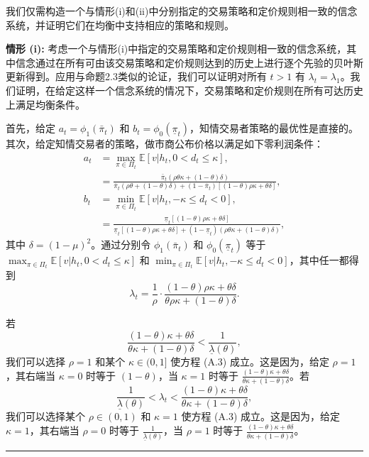 \documentclass[12pt,a4paper]{article}
\newenvironment{translation}{%
  \par\vspace{2pt}\noindent%
  \color{transblue}%
  \ignorespaces
}{%
  \par\vspace{4pt}\hrule\vspace{6pt}%
}
\begin{document}
\begin{translation}
我们仅需构造一个与情形(i)和(ii)中分别指定的交易策略和定价规则相一致的信念系统，并证明它们在均衡中支持相应的策略和规则。

\textbf{情形 (i):} 考虑一个与情形(i)中指定的交易策略和定价规则相一致的信念系统，其中信念通过在所有可由该交易策略和定价规则达到的历史上进行逐个先验的贝叶斯更新得到。应用与命题2.3类似的论证，我们可以证明对所有 $t > 1$ 有 $\lambda_t = \lambda_1$。我们证明，在给定这样一个信念系统的情况下，交易策略和定价规则在所有可达历史上满足均衡条件。

首先，给定 $a_t = \phi_1(\bar{\pi}_t)$ 和 $b_t = \phi_0(\underline{\pi}_t)$，知情交易者策略的最优性是直接的。其次，给定知情交易者的策略，做市商公布价格以满足如下零利润条件：
\begin{align*}
a_t &= \max_{\pi\in\Pi_t} \mathbb{E}[v|h_t, 0 < d_t \leq \kappa], \\
&= \frac{\bar{\pi}_t(\rho\theta\kappa + (1-\theta)\delta)}{\bar{\pi}_t(\rho\theta + (1-\theta)\delta) + (1-\bar{\pi}_t)[(1-\theta)\rho\kappa + \theta\delta]}, \\
b_t &= \min_{\pi\in\Pi_t} \mathbb{E}[v|h_t, -\kappa \leq d_t < 0], \\
&= \frac{\underline{\pi}_t[(1-\theta)\rho\kappa + \theta\delta]}{\underline{\pi}_t[(1-\theta)\rho\kappa + \theta\delta] + (1-\underline{\pi}_t)(\rho\theta\kappa + (1-\theta)\delta)},
\end{align*}
其中 $\delta = (1-\mu)^2$。通过分别令 $\phi_1(\bar{\pi}_t)$ 和 $\phi_0(\underline{\pi}_t)$ 等于 $\max_{\pi\in\Pi_t} \mathbb{E}[v|h_t, 0 < d_t \leq \kappa]$ 和 $\min_{\pi\in\Pi_t} \mathbb{E}[v|h_t, -\kappa \leq d_t < 0]$，其中任一都得到
\[
\lambda_t = \frac{1}{\rho} \cdot \frac{(1-\theta)\rho\kappa + \theta\delta}{\theta\rho\kappa + (1-\theta)\delta}. \tag{A.3}
\]

若
\[
\frac{(1-\theta)\kappa + \theta\delta}{\theta\kappa + (1-\theta)\delta} < \frac{1}{\underline{\lambda}(\theta)},
\]
我们可以选择 $\rho = 1$ 和某个 $\kappa \in (0, 1]$ 使方程 (A.3) 成立。这是因为，给定 $\rho = 1$，其右端当 $\kappa = 0$ 时等于 $(1-\theta)$，当 $\kappa = 1$ 时等于 $\frac{(1-\theta)\kappa + \theta\delta}{\theta\kappa + (1-\theta)\delta}$。若
\[
\frac{1}{\underline{\lambda}(\theta)} < \lambda_t < \frac{(1-\theta)\kappa + \theta\delta}{\theta\kappa + (1-\theta)\delta},
\]
我们可以选择某个 $\rho \in (0, 1)$ 和 $\kappa = 1$ 使方程 (A.3) 成立。这是因为，给定 $\kappa = 1$，其右端当 $\rho = 0$ 时等于 $\frac{1}{\underline{\lambda}(\theta)}$，当 $\rho = 1$ 时等于 $\frac{(1-\theta)\kappa + \theta\delta}{\theta\kappa + (1-\theta)\delta}$。


\end{translation}
\end{document}
